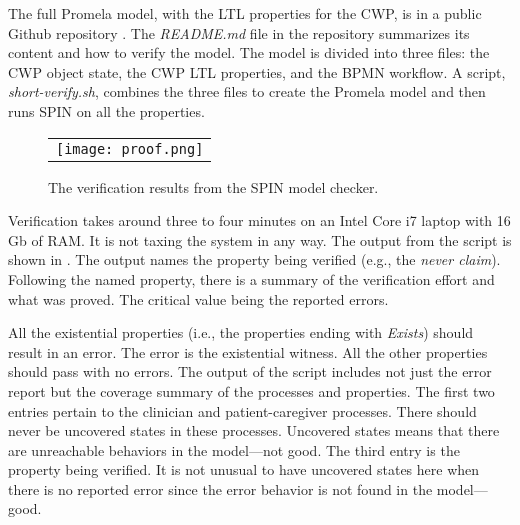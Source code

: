 The full Promela model, with the LTL properties for the CWP, is in a public Github repository \cite{repo}. The \emph{README.md} file in the repository summarizes its content and how to verify the model. The model is divided into three files: the CWP object state, the CWP LTL properties, and the BPMN workflow. A script, \emph{short-verify.sh}, combines the three files to create the Promela model and then runs SPIN on all the properties.

\begin{figure}
  \begin{center}
    \begin{tabular}{c}
      \texttt{[image: proof.png]}
    \end{tabular}
  \end{center}
\caption{The verification results from the SPIN model checker.}
\label{fig:proof}
\end{figure}

Verification takes around three to four minutes on an Intel Core i7 laptop with 16 Gb of RAM. It is not taxing the system in any way. The output from the script is shown in . The output names the property being verified (e.g., the \emph{never claim}). Following the named property, there is a  summary of the verification effort and what was proved. The critical value being the reported errors.

All the existential properties (i.e., the properties ending with \emph{Exists}) should result in an error. The error is the existential witness. All the other properties should pass with no errors. The output of the script includes not just the error report but the coverage summary of the processes and properties. The first two entries pertain to the clinician and patient-caregiver processes. There should never be uncovered states in these processes. Uncovered states means that there are unreachable behaviors in the model---not good. The third entry is the property being verified. It is not unusual to have uncovered states here when there is no reported error since the error behavior is not found in the model---good.